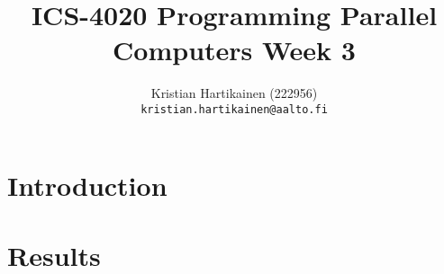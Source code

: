 \documentclass[a4paper,10pt]{article}
\title{ICS-4020 Programming Parallel Computers Week 3}
\author{Kristian Hartikainen (222956)\\
       {\tt kristian.hartikainen@aalto.fi}}
\begin{document}
\maketitle

\pagebreak

\section{Introduction}


\pagebreak
\section{Results}

\end{document}
